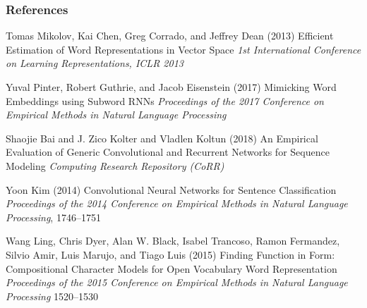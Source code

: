 \begin{frame}
    \frametitle{References}
    \fontsize{8}{4}\selectfont
    \begin{thebibliography}{99} %
         Tomas Mikolov, Kai Chen, Greg Corrado, and Jeffrey Dean (2013)
        \newblock Efficient Estimation of Word Representations in Vector Space
        \newblock \emph{1st International Conference on Learning Representations, {ICLR} 2013}
        
         Yuval Pinter, Robert Guthrie,
         and Jacob Eisenstein (2017)
        \newblock Mimicking Word Embeddings using Subword RNNs
        \newblock \emph{Proceedings of the 2017 Conference on Empirical Methods in Natural Language Processing} 
        
         Shaojie Bai and J. Zico
        Kolter and Vladlen Koltun (2018)
        \newblock An Empirical Evaluation of Generic Convolutional and Recurrent Networks
        for Sequence Modeling
        \newblock \emph{Computing Research Repository (CoRR)}

         Yoon Kim (2014)
        \newblock Convolutional Neural Networks for Sentence Classification
        \newblock \emph{Proceedings of the 2014 Conference on Empirical Methods in Natural Language Processing}, 1746--1751
    
         Wang Ling, Chris Dyer, Alan W.
        Black, Isabel Trancoso, Ramon Fermandez, Silvio Amir, Luis
        Marujo, and Tiago Luis (2015)
        \newblock Finding Function in Form: Compositional Character Models for Open Vocabulary Word Representation
        \newblock \emph{Proceedings of the 2015 Conference on Empirical Methods in Natural Language Processing} 1520--1530
    \end{thebibliography}
    
\end{frame}